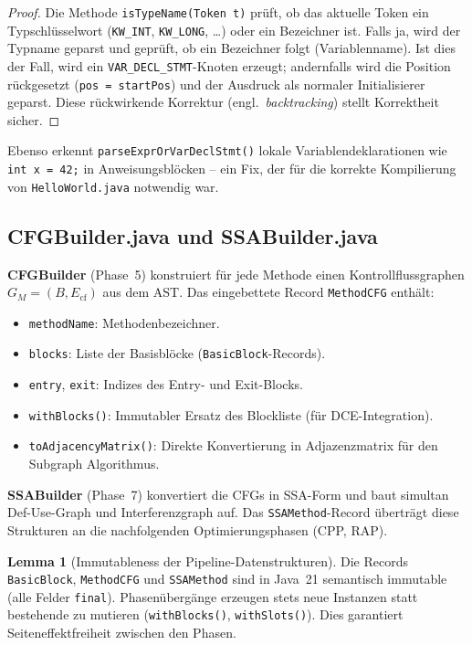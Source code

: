 ﻿\documentclass[a4paper,12pt]{article}
\theoremstyle{definition}
\newtheorem{lemma}{Lemma}
\begin{document}
\begin{proof}
Die Methode \texttt{isTypeName(Token~t)} pr\"uft, ob das
aktuelle Token ein Typschl\"usselwort
(\texttt{KW\_INT}, \texttt{KW\_LONG}, \ldots) oder ein
Bezeichner ist.  Falls ja, wird der Typname geparst und
gepr\"uft, ob ein Bezeichner folgt (Variablenname).
Ist dies der Fall, wird ein \texttt{VAR\_DECL\_STMT}-Knoten
erzeugt; andernfalls wird die Position r\"uckgesetzt
(\texttt{pos = startPos}) und der Ausdruck als normaler
Initialisierer geparst.  Diese r\"uckwirkende Korrektur
(engl.\ \emph{backtracking}) stellt Korrektheit sicher.
\end{proof}

Ebenso erkennt \texttt{parseExprOrVarDeclStmt()} lokale
Variablendeklarationen wie \texttt{int x = 42;} in
Anweisungsbl\"ocken -- ein Fix, der f\"ur die korrekte
Kompilierung von \texttt{HelloWorld.java} notwendig war.

\subsection{CFGBuilder.java und SSABuilder.java}

\textbf{CFGBuilder} (Phase~5) konstruiert f\"ur jede Methode
einen Kontrollflussgraphen $G_M = (B, E_{\mathrm{cf}})$ aus dem AST.
Das eingebettete Record \texttt{MethodCFG} enth\"alt:
\begin{itemize}
    \item \texttt{methodName}: Methodenbezeichner.
    \item \texttt{blocks}: Liste der Basisbl\"ocke
          (\texttt{BasicBlock}-Records).
    \item \texttt{entry}, \texttt{exit}: Indizes des Entry-
          und Exit-Blocks.
    \item \texttt{withBlocks()}: Immutabler Ersatz des
          Blockliste (f\"ur DCE-Integration).
    \item \texttt{toAdjacencyMatrix()}: Direkte Konvertierung
          in Adjazenzmatrix f\"ur den Subgraph Algorithmus.
\end{itemize}

\textbf{SSABuilder} (Phase~7) konvertiert die CFGs in
SSA-Form und baut simultan Def-Use-Graph und
Interferenzgraph auf.  Das \texttt{SSAMethod}-Record
\"ubertr\"agt diese Strukturen an die nachfolgenden
Optimierungsphasen (CPP, RAP).

\begin{lemma}[Immutableness der Pipeline-Datenstrukturen]
\label{lem:immutable}
Die Records \texttt{BasicBlock}, \texttt{MethodCFG} und
\texttt{SSAMethod} sind in Java~21 semantisch immutable
(alle Felder \texttt{final}).  Phasen\"uberg\"ange erzeugen
stets neue Instanzen statt bestehende zu mutieren
(\texttt{withBlocks()}, \texttt{withSlots()}).  Dies
garantiert Seiteneffektfreiheit zwischen den Phasen.
\end{lemma}
\end{document}
